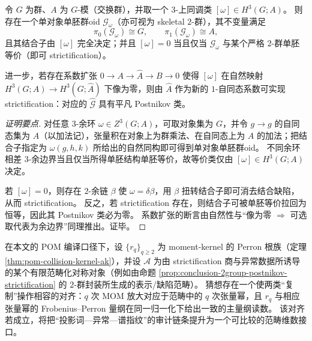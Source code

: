 \begin{proposition}\label{prop:conclusion-2group-postnikov-strictification}
令 \(G\) 为群、\(A\) 为 \(G\)-模（交换群），并取一个 \(3\)-上同调类 \([\omega]\in H^3(G;A)\)。
则存在一个单对象单胚群oid \(\mathcal{G}_\omega\)（亦可视为 skeletal \(2\)-群），其不变量满足
\[
\pi_0(\mathcal{G}_\omega)\cong G,\qquad \pi_1(\mathcal{G}_\omega)\cong A,
\]
且其结合子由 \([\omega]\) 完全决定；并且 \([\omega]=0\) 当且仅当 \(\mathcal{G}_\omega\) 与某个严格 \(2\)-群单胚等价（即可 strictification）。
\par
进一步，若存在系数扩张 \(0\to A\to \widehat A\to B\to 0\) 使得 \([\omega]\) 在自然映射 \(H^3(G;A)\to H^3(G;\widehat A)\) 下像为零，则由 \(\widehat A\) 作为新的 \(1\)-自同态系数可实现 strictification：对应的 \(\widehat{\mathcal{G}}\) 具有平凡 Postnikov 类。
\end{proposition}
\begin{proof}[证明要点]
对任意 \(3\)-余环 \(\omega\in Z^3(G;A)\)，可取对象集为 \(G\)，并令 \(g\to g\) 的自同态集为 \(A\)（以加法记），张量积在对象上为群乘法、在自同态上为 \(A\) 的加法；把结合子指定为 \(\omega(g,h,k)\) 所给出的自然同构即可得到单对象单胚群oid。
不同余环相差 \(3\)-余边界当且仅当所得单胚结构单胚等价，故等价类仅由 \([\omega]\in H^3(G;A)\) 决定。
\par
若 \([\omega]=0\)，则存在 \(2\)-余链 \(\beta\) 使 \(\omega=\delta\beta\)，用 \(\beta\) 扭转结合子即可消去结合缺陷，从而 strictification。
反之，若 strictification 存在，则结合子可被单胚等价拉回为恒等，因此其 Postnikov 类必为零。
系数扩张的断言由自然性与“像为零 \(\Rightarrow\) 可选取代表为余边界”同理推出。证毕。
\end{proof}

\begin{conjecture}\label{conj:conclusion-pom-fpdim-dictionary}
在本文的 POM 编译口径下，设 \(\{r_q\}_{q\ge 2}\) 为 moment-kernel 的 Perron 根族（定理 \ref{thm:pom-collision-kernel-ak}），并设 \(\mathcal{A}\) 为由 strictification 商与异常数据所诱导的某个有限范畴化对称对象（例如由命题 \ref{prop:conclusion-2group-postnikov-strictification} 的 \(2\)-群封装所生成的表示/缺陷范畴）。
猜想存在一个使两类“复制”操作相容的对齐：\(q\) 次 MOM 放大对应于范畴中的 \(q\) 次张量幂，且 \(r_q\) 与相应张量幂的 Frobenius--Perron 量纲在同一归一化下给出一致的主量纲读数。
该对齐若成立，将把“投影词—异常—谱指纹”的审计链条提升为一个可比较的范畴维数接口。
\end{conjecture}
